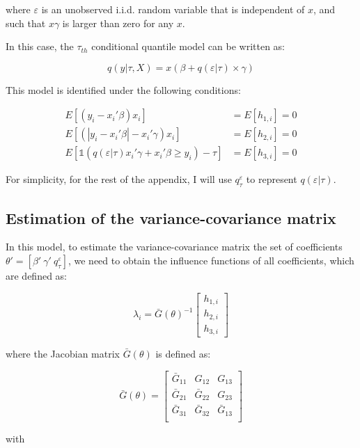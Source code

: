 \documentclass[
  authoryear,
  preprint,
  1p]{elsarticle}
\begin{document}
where \(\varepsilon\) is an unobserved i.i.d. random variable that is
independent of \(x\), and such that \(x\gamma\) is larger than zero for
any \(x\).

In this case, the \(\tau_{th}\) conditional quantile model can be
written as:

\[q(y|\tau,X) = x(\beta + q(\varepsilon |\tau) \times \gamma)\]

This model is identified under the following conditions:

\[\begin{aligned}
  E[(y_i-x_i'\beta)x_i ]  &= E[h_{1,i}]=0 \\
  E[ (|y_i-x_i'\beta|-x_i' \gamma) x_i ] &=E[h_{2,i}]=0 \\
  E\left[  \mathbb{1}\left( q(\varepsilon|\tau) x_i'\gamma +x_i'\beta\geq  y_i  \right) - \tau \right] 
   &=E[h_{3,i}]=0 
\end{aligned}
\]

For simplicity, for the rest of the appendix, I will use
\(q^\varepsilon_\tau\) to represent \(q(\varepsilon |\tau)\).

\hypertarget{estimation-of-the-variance-covariance-matrix}{%
\subsection{Estimation of the variance-covariance
matrix}\label{estimation-of-the-variance-covariance-matrix}}

In this model, to estimate the variance-covariance matrix the set of
coefficients \(\theta'=[\beta' \ \gamma' \ q^\varepsilon_\tau]\), we
need to obtain the influence functions of all coefficients, which are
defined as:

\[\lambda_i = \bar G(\theta)^{-1}
\begin{bmatrix}
h_{1,i} \\
h_{2,i} \\
h_{3,i}
\end{bmatrix}
\]

where the Jacobian matrix \(\bar G(\theta)\) is defined as:

\[\bar G(\theta) = \begin{bmatrix}
\bar G_{11} & G_{12} & G_{13} \\
\bar G_{21} & \bar G_{22} & G_{23} \\
\bar G_{31} & \bar G_{32} & \bar G_{13} \\
\end{bmatrix}
\]

with
\end{document}
